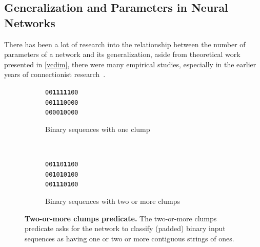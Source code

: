 \documentclass[thesis]{subfiles}
\begin{document}
	\subsection{Generalization and Parameters in Neural Networks}
	There has been a lot of research into the relationship between the number of parameters of a network and its generalization, aside from theoretical work presented in \cref{vcdim}, there were many empirical studies, especially in the earlier years of connectionist research~\citet{denker1987large, giles1987learning, hinton1987learning, lecun1989generalization, ahmad1989scaling,hanson1989comparing}.
	\begin{figure}[tbp]
		\centering
		\large
        \renewcommand{\ttdefault}{pcr}
		\begin{subfigure}[t]{0.45\textwidth}
			\begin{center}
			\texttt{00\textbf{11111}00}\\
			\texttt{00\textbf{111}0000}\\
			\texttt{0000\textbf{1}0000}
			\end{center}
			\caption{Binary sequences with one clump}
			\label{fig:oneclump}
		\end{subfigure}
		~
		\begin{subfigure}[t]{0.45\textwidth}
			\begin{center}
			\texttt{00\textbf{11}0\textbf{11}00}\\
			\texttt{00\textbf{1}0\textbf{1}0\textbf{1}00}\\
			\texttt{00\textbf{111}0\textbf{1}00}
			\end{center}
			\caption{Binary sequences with two or more clumps}
			\label{fig:twoclumps}
		\end{subfigure}
		
		\caption[Two-or-more clumps predicate]{\textbf{Two-or-more clumps predicate.} The two-or-more clumps predicate asks for the network to classify (padded) binary input sequences as having one or two or more contiguous strings of ones.}
		\label{fig:tomclumps}
	\end{figure}
\end{document}

